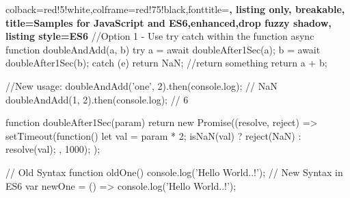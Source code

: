\documentclass[10pt]{article}
\begin{document}
\kant[1-3]

\begin{tcblisting}{colback=red!5!white,colframe=red!75!black,fonttitle=\bfseries,
		listing only, breakable,
		title=Samples for JavaScript and ES6,enhanced,drop fuzzy shadow,
		listing style=ES6
	}
//Option 1 - Use try catch within the function
async function doubleAndAdd(a, b) {
	try {
		a = await doubleAfter1Sec(a);
		b = await doubleAfter1Sec(b);
	} catch (e) {
		return NaN; //return something
	}
	return a + b;
}

//New usage:
doubleAndAdd('one', 2).then(console.log); // NaN
doubleAndAdd(1, 2).then(console.log); // 6

function doubleAfter1Sec(param) {
	return new Promise((resolve, reject) => {
		setTimeout(function() {
			let val = param * 2;
			isNaN(val) ? reject(NaN) : resolve(val);
		}, 1000);
	});
}


	// Old Syntax
	function oldOne() {
		console.log('Hello World..!');
	}
	// New Syntax in ES6
	var newOne = () => {
		console.log('Hello World..!');
	}
\end{tcblisting}
\end{document}
